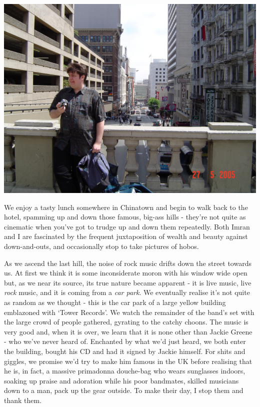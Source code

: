 \documentclass[a5paper,titlepage,11pt]{book}
\begin{document}
\begin{center}\includegraphics[width=\textwidth]{gfx/DSC00625}\end{center}

We enjoy a tasty lunch somewhere in Chinatown and begin to walk back to the hotel, spamming up and down those famous, big-ass hills - they're not quite as cinematic when you've got to trudge up and down them repeatedly. Both Imran and I are fascinated by the frequent juxtaposition of wealth and beauty against down-and-outs, and occasionally stop to take pictures of hobos.

As we ascend the last hill, the noise of rock music drifts down the street towards us. At first we think it is some inconsiderate moron with his window wide open but, as we near its source, its true nature became apparent - it is live music, live \emph{rock} music, and it is coming from a \emph{car park}. We eventually realise it's not quite as random as we thought - this is the car park of a large yellow building emblazoned with `Tower Records'. We watch the remainder of the band's set with the large crowd of people gathered, gyrating to the catchy choons. The music is very good and, when it is over, we learn that it is none other than Jackie Greene - who we've never heard of. Enchanted by what we'd just heard, we both enter the building, bought his CD and had it signed by Jackie himself. For shits and giggles, we promise we'd try to make him famous in the UK before realising that he is, in fact, a massive primadonna douche-bag who wears sunglasses indoors, soaking up praise and adoration while his poor bandmates, skilled musicians down to a man, pack up the gear outside. To make their day, I stop them and thank them.
\end{document}
